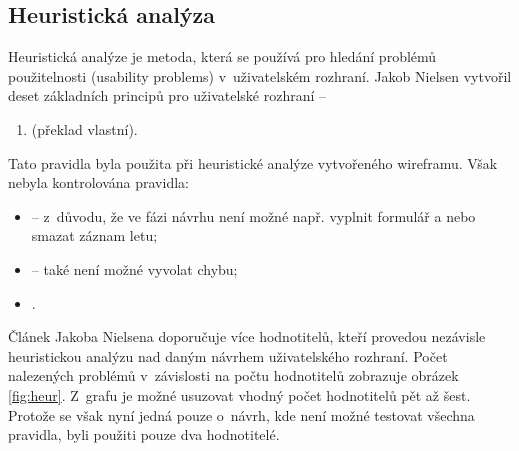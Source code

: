 \documentclass[thesis=M,czech]{FITthesis}[2012/06/26]
\begin{document}
\subsection{Heuristická analýza}
Heuristická analýze je metoda, která se používá pro hledání problémů použitelnosti (usability problems) v~uživatelském rozhraní. \cite{howtoheuristic} Jakob Nielsen vytvořil deset základních principů pro uživatelské rozhraní --
\begin{enumerate}
 \item {} \cite{10heuristics} (překlad vlastní).
\end{enumerate}

Tato pravidla byla použita při heuristické analýze vytvořeného wireframu. Však nebyla kontrolována pravidla:
\begin{itemize}
\item {} -- z~důvodu, že ve fázi návrhu není možné např. vyplnit formulář a nebo smazat záznam letu;
\item {} -- také není možné vyvolat chybu;
\item {}.
\end{itemize}

Článek Jakoba Nielsena \cite{howtoheuristic} doporučuje více hodnotitelů, kteří provedou nezávisle heuristickou analýzu nad daným návrhem uživatelského rozhraní. Počet nalezených problémů v~závislosti na počtu hodnotitelů zobrazuje obrázek \ref{fig:heur}. Z~grafu je možné usuzovat vhodný počet hodnotitelů pět až šest. Protože se však nyní jedná pouze o~návrh, kde není možné testovat všechna pravidla, byli použiti pouze dva hodnotitelé.
\end{document}
